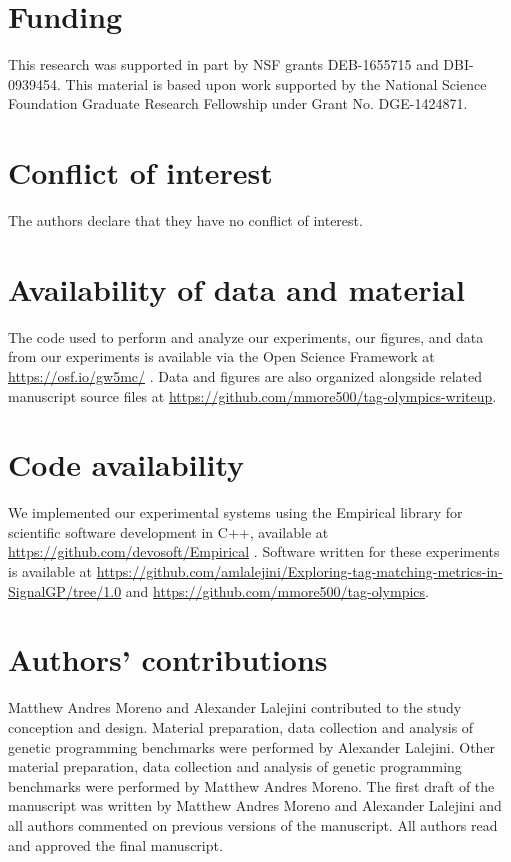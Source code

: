 \section*{Funding}

This research was supported in part by NSF grants DEB-1655715 and DBI-0939454.
This material is based upon work supported by the National Science Foundation Graduate Research Fellowship under Grant No. DGE-1424871.


\section*{Conflict of interest}

The authors declare that they have no conflict of interest.

\section*{Availability of data and material}

The code used to perform and analyze our experiments, our figures, and data from our experiments is available via the Open Science Framework at \url{https://osf.io/gw5mc/} \citep{foster2017open}.
Data and figures are also organized alongside related manuscript source files at \url{https://github.com/mmore500/tag-olympics-writeup}. 

\section*{Code availability} 

We implemented our experimental systems using the Empirical library for scientific software development in C++, available at \url{https://github.com/devosoft/Empirical} \citep{charles_ofria_2019_2575607}.
Software written for these experiments is available at \url{https://github.com/amlalejini/Exploring-tag-matching-metrics-in-SignalGP/tree/1.0} and \url{https://github.com/mmore500/tag-olympics}.

\section*{Authors' contributions} Matthew Andres Moreno and Alexander Lalejini contributed to the study conception and design.
Material preparation, data collection and analysis of genetic programming benchmarks were performed by Alexander Lalejini.
Other material preparation, data collection and analysis of genetic programming benchmarks were performed by Matthew Andres Moreno.
The first draft of the manuscript was written by Matthew Andres Moreno and Alexander Lalejini and all authors commented on previous versions of the manuscript.
All authors read and approved the final manuscript.
